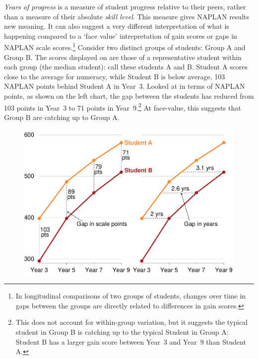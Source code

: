 \textit{Years of progress} is a measure of student progress relative to their peers, rather than a measure of their absolute \textit{skill level}. This measure gives NAPLAN results new meaning. It can also suggest a very different interpretation of what is happening compared to a `face value' intrepretation of gain scores or gaps in NAPLAN scale scores.\footnote{In longitudinal comparisons of two groups of students, changes over time in gaps between the groups are directly related to differences in gain scores.}
Consider two distinct groups of students: Group A and Group B. The scores displayed on  are those of a representative student within each group (the median student): call these students A and B. Student A scores close to the average for numeracy, while Student B is below average, 103 NAPLAN points behind Student A in \mbox{Year 3}. Looked at in terms of NAPLAN points, as shown on the left chart, the gap between the students has reduced from 103 points in \mbox{Year 3} to 71 points in \mbox{Year 9}.\footnote{This does not account for within-group variation, but it suggests the typical student in Group B is catching up to the typical Student in Group A: Student B has a larger gain score between \mbox{Year 3} and \mbox{Year 9} than Student A.} At face-value, this suggests that Group B are catching up to Group A.

\begin{figure}[H]
 \includegraphics[width=\columnwidth]{atlas/NSSvsY.pdf}\label{fig:example}

\end{figure}
\vspace{-6pt}


